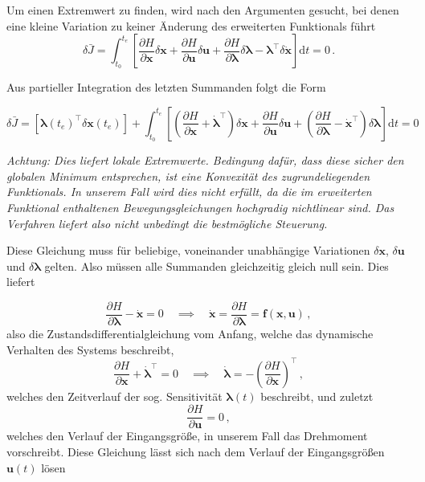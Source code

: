\documentclass[]{scrartcl}
\begin{document}
Um einen Extremwert zu finden, wird nach den Argumenten gesucht, bei denen eine kleine Variation zu keiner Änderung des erweiterten Funktionals führt
\begin{equation}
	\delta \bar{J} = \int_{t_0}^{t_e} \left[ \frac{\partial H}{\partial \mathbf{x}} \delta\mathbf{x} + \frac{\partial H}{\partial \mathbf{u}} \delta\mathbf{u} + \frac{\partial H}{\partial \boldsymbol{\lambda}} \delta\boldsymbol{\lambda} - \boldsymbol{\lambda}^{\top} \delta\dot{\mathbf{x}} \right] \mathrm{d}t = 0 \, .
\end{equation}

Aus partieller Integration des letzten Summanden folgt die Form

\begin{equation}
	\delta \bar{J} = \left[ \boldsymbol{\lambda}(t_e)^{\top} \delta\mathbf{x}(t_e) \right] + \int_{t_0}^{t_e} \left[ \left( \frac{\partial H}{\partial \mathbf{x}} + \dot{\boldsymbol{\lambda}}^{\top} \right) \delta\mathbf{x} + \frac{\partial H}{\partial \mathbf{u}} \delta\mathbf{u} + \left( \frac{\partial H}{\partial \boldsymbol{\lambda}} - \dot{\mathbf{x}}^{\top} \right) \delta\boldsymbol{\lambda} \right] \mathrm{d}t = 0
\end{equation}

\textit{Achtung: Dies liefert lokale Extremwerte. Bedingung dafür, dass diese sicher den globalen Minimum entsprechen, ist eine Konvexität des zugrundeliegenden Funktionals. In unserem Fall wird dies nicht erfüllt, da die im erweiterten Funktional enthaltenen Bewegungsgleichungen hochgradig nichtlinear sind. Das Verfahren liefert also nicht unbedingt die bestmögliche Steuerung.}

Diese Gleichung muss für beliebige, voneinander unabhängige Variationen $\delta \mathbf{x}$, $\delta \mathbf{u}$ und $\delta \boldsymbol{\lambda}$ gelten. Also müssen alle Summanden gleichzeitig gleich null sein. Dies liefert

\begin{equation}
	\frac{\partial H}{\partial \boldsymbol{\lambda}} - \dot{\mathbf{x}} = 0 \quad \implies \quad \dot{\mathbf{x}} = \frac{\partial H}{\partial \boldsymbol{\lambda}} = \mathbf{f}(\mathbf{x}, \mathbf{u}) \, ,
	\label{zustandsglErneut}
\end{equation}
also die Zustandsdifferentialgleichung vom Anfang, welche das dynamische Verhalten des Systems beschreibt,
\begin{equation}
	\frac{\partial H}{\partial \mathbf{x}} + \dot{\boldsymbol{\lambda}}^{\top} = 0 \quad \implies \quad \dot{\boldsymbol{\lambda}} = -\left(\frac{\partial H}{\partial \mathbf{x}}\right)^{\top} \, ,
	\label{sensitivitaet}
\end{equation}
welches den Zeitverlauf der sog. Sensitivität  $\boldsymbol{\lambda}(t)$ beschreibt, und zuletzt
\begin{equation}
	\frac{\partial H}{\partial \mathbf{u}} = 0 \, ,
	\label{indirektVEingangsgroesse}
\end{equation}
welches den Verlauf der Eingangsgröße, in unserem Fall das Drehmoment vorschreibt. Diese Gleichung lässt sich nach dem Verlauf der Eingangsgrößen $\mathbf{u}(t)$ lösen
\end{document}
